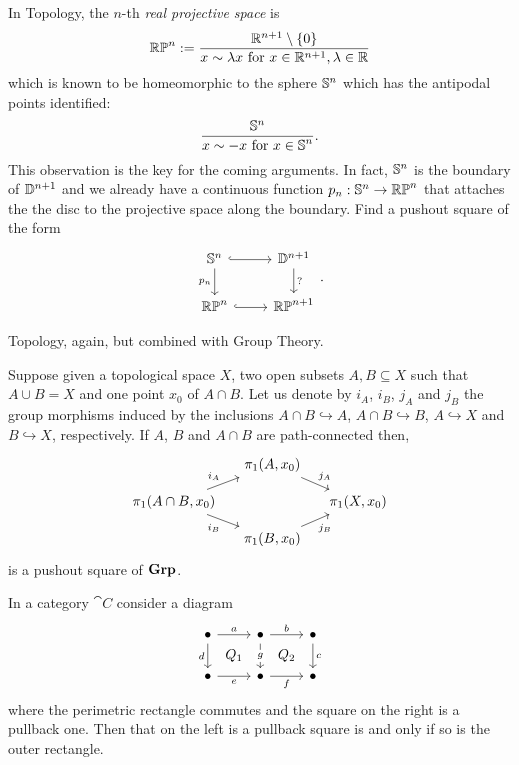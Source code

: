 \begin{exercise}
  In Topology, the \(n\)-th {\em real projective space} is
  \[\mathbb{RP}^n := \frac{\mathbb R^{n+1} \setminus \left\{0\right\}}{x \sim \lambda x \text{ for } x \in
      \mathbb R^{n+1}, \lambda \in \mathbb R}\] which is known to be homeomorphic to
  the sphere \(\mathbb S^n\) which has the antipodal points identified:
  \[\frac{\mathbb S^n}{\displaystyle x \sim - x \text{ for } x \in \mathbb S^n} .\]
  This observation is the key for the coming arguments. In fact,
  \(\mathbb S^n\) is the boundary of \(\mathbb D^{n+1}\) and we already have a
  continuous function \(p_n : \mathbb S^n \to \mathbb{RP}^n\) that attaches the
  the disc to the projective space along the boundary. Find a pushout
  square of the form
  \[\begin{tikzcd}
      \sph^n \ar[hookrightarrow, r] \ar["p_n", d, swap] & \dsc^{n+1} \ar["?", d] \\
      \rpspc^n \ar[r, hookrightarrow] & \rpspc^{n+1}
    \end{tikzcd}.\]
\end{exercise}

Topology, again, but combined with Group Theory.

\begin{example}
  Suppose given a topological space \(X\), two open subsets
  \(A, B \subseteq X\) such that \(A \cup B = X\) and one point
  \(x_0\) of \(A \cap B\). Let us denote by \(i_A\), \(i_B\), \(j_A\) and
  \(j_B\) the group morphisms induced by the inclusions
  \(A \cap B \hookrightarrow A\), \(A \cap B \hookrightarrow B\),
  \(A \hookrightarrow X\) and \(B \hookrightarrow X\), respectively. If
  \(A\), \(B\) and \(A \cap B\) are path-connected then,
  \[\begin{tikzcd}[sep=small]
      & \pi_1(A, x_0) \ar["{j_A}", dr] & \\
      \pi_1(A \cap B, x_0) \ar["{i_A}", ur] \ar["{i_B}", dr, swap] & & \pi_1(X, x_0) \\
      & \pi_1(B, x_0) \ar["{j_B}", ur, swap]
    \end{tikzcd}\] is a pushout square of \(\mathbf{Grp}\).
\end{example}


\begin{proposition}
  In a category \(\cat C\) consider a diagram
  \[\begin{tikzcd}
      \bullet \ar["a", r] \ar["d", d, swap] \ar["{Q_1}", dr, phantom] & \bullet \ar["b", r] \ar["g" description, d] \ar["{Q_2}", dr, phantom] & \bullet \ar["c", d]\\
      \bullet \ar["e", r, swap] & \bullet \ar["f", r, swap] & \bullet
    \end{tikzcd}\] where the perimetric rectangle commutes and the
  square on the right is a pullback one. Then that on the left is a
  pullback square is and only if so is the outer rectangle.
\end{proposition}

